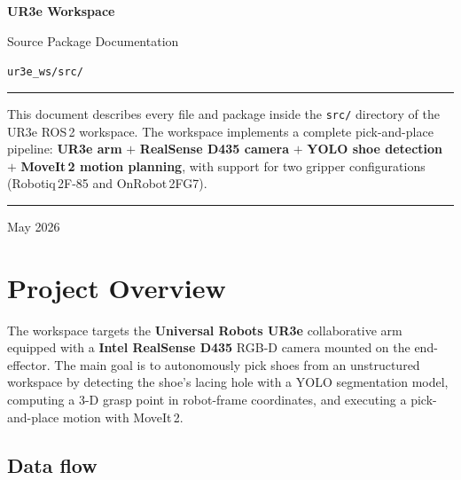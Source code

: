 \documentclass[11pt,a4paper]{article}
\begin{document}
\begin{titlepage}
  \centering
  \vspace*{3cm}
  {\Huge\bfseries UR3e Workspace}\par
  \vspace{0.5em}
  {\Large Source Package Documentation}\par
  \vspace{2em}
  {\large\texttt{ur3e\_ws/src/}}\par
  \vspace{3em}
  \noindent\rule{\linewidth}{0.6pt}\par
  \vspace{0.5em}
  \begin{minipage}{0.85\linewidth}
    \centering
    This document describes every file and package inside the
    \texttt{src/} directory of the UR3e ROS\,2 workspace.
    The workspace implements a complete pick-and-place pipeline:
    \textbf{UR3e arm} $+$ \textbf{RealSense D435 camera} $+$
    \textbf{YOLO shoe detection} $+$ \textbf{MoveIt\,2 motion planning},
    with support for two gripper configurations
    (Robotiq\,2F-85 and OnRobot\,2FG7).
  \end{minipage}\par
  \vspace{0.5em}
  \noindent\rule{\linewidth}{0.6pt}\par
  \vfill
  {\small May 2026}
\end{titlepage}

\tableofcontents
\newpage

\section{Project Overview}

The workspace targets the \textbf{Universal Robots UR3e} collaborative arm
equipped with a \textbf{Intel RealSense D435} RGB-D camera mounted on the
end-effector. The main goal is to autonomously pick shoes from an unstructured
workspace by detecting the shoe's lacing hole with a YOLO segmentation model,
computing a 3-D grasp point in robot-frame coordinates, and executing a
pick-and-place motion with MoveIt\,2.

\subsection*{Data flow}
\end{document}
